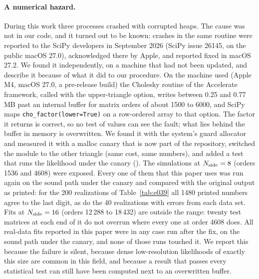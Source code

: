 \paragraph{A numerical hazard.} During this work three processes crashed with corrupted heaps. The
cause was not in our code, and it turned out to be known: crashes in the same routine were reported
to the SciPy developers in September 2026 (SciPy issue 26145, on the public macOS 27.0), acknowledged
there by Apple, and reported fixed in macOS 27.2. We found it independently, on a machine that had
not been updated, and describe it because of what it did to our procedure. On the machine used (Apple
M4, macOS 27.0, a pre-release build) the
Cholesky routine of the Accelerate framework, called with the upper-triangle option, writes between
0.25 and 0.77 MB past an internal buffer for matrix orders of about 1500 to 6000, and SciPy maps
\texttt{cho\_factor(lower=True)} on a row-ordered array to that option. The factor it returns is
correct, so no test of values can see the fault; what lies behind the buffer in memory is
overwritten. We found it with the system's guard allocator and measured it with a malloc canary that
is now part of the repository, switched the module to the other triangle (same cost, same numbers),
and added a test that runs the likelihood under the canary (). The simulations at $N_{\rm side} = 8$ (orders 1536 and 4608) were exposed. Every one of
them that this paper uses was run again on the sound path under the canary and compared with the
original output as printed: for the 200 realizations of Table~\ref{tab:e039} all 1480 printed numbers
agree to the last digit, as do the 40 realizations with errors from each data set. Fits at
$N_{\rm side} = 16$ (orders 12\,288 to 18\,432) are outside the range: twenty test matrices at each
end of it do not overrun where every one at order 4608 does. All real-data fits reported in this
paper were in any case run after the fix, on the sound path under the canary, and none of those runs
touched it.
We report this because the failure is silent, because dense low-resolution likelihoods of exactly
this size are common in this field, and because a result that passes every statistical test can
still have been computed next to an overwritten buffer.

